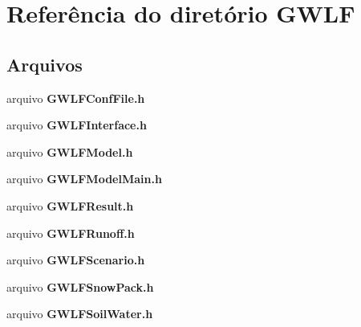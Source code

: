 \section{Referência do diretório G\+W\+LF}
\label{dir_f8e3d8131f805c48e914b856d5d65a27}
\subsection*{Arquivos}
\begin{DoxyCompactItemize}
\item 
arquivo {\bf G\+W\+L\+F\+Conf\+File.\+h}
\item 
arquivo {\bf G\+W\+L\+F\+Interface.\+h}
\item 
arquivo {\bf G\+W\+L\+F\+Model.\+h}
\item 
arquivo {\bf G\+W\+L\+F\+Model\+Main.\+h}
\item 
arquivo {\bf G\+W\+L\+F\+Result.\+h}
\item 
arquivo {\bf G\+W\+L\+F\+Runoff.\+h}
\item 
arquivo {\bf G\+W\+L\+F\+Scenario.\+h}
\item 
arquivo {\bf G\+W\+L\+F\+Snow\+Pack.\+h}
\item 
arquivo {\bf G\+W\+L\+F\+Soil\+Water.\+h}
\end{DoxyCompactItemize}
